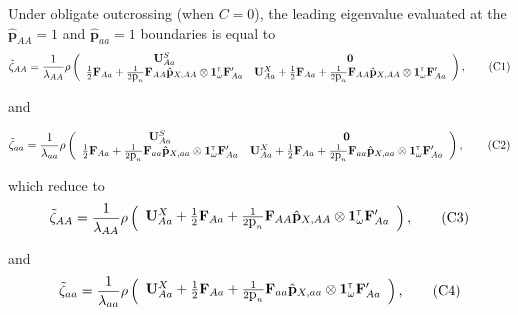 \documentclass[11pt]{article}
\newcommand\numberthis{\addtocounter{equation}{1}\tag{\theequation}}
\def\mbf#1{\mathbf{#1}}
\newcommand{\tr}{{\mbox{\tiny \sf T}}}
\begin{document}
Under obligate outcrossing (when $C=0$), the leading eigenvalue evaluated at the $\hat{\mbf{p}}_{AA} = 1$ and $\hat{\mbf{p}}_{aa} = 1$ boundaries is equal to
\begin{align*} \label{eq:eigAAOut}
	\tilde{\zeta}_{AA} = 
		\frac{1}{\lambda_{AA}}\rho\left(\begin{array}{cc}
\mathbf{U}^S_{Aa}  & \mathbf{0} \\
 \frac{1}{2} \mbf{F}_{Aa}+\frac{1}{2\mbox{p}_{n}}\mbf{F}_{AA} \hat{\mbf{p}}_{X,AA} \otimes \mathbf{1}^\tr_{\omega} \mathbf{F}_{Aa}^\prime &\mathbf{U}^X_{Aa} + \frac{1}{2} \mbf{F}_{Aa} +\frac{1}{2\mbox{p}_{n}} \mbf{F}_{AA} \hat{\mbf{p}}_{X,AA} \otimes \mathbf{1}^\tr_{\omega} \mathbf{F}_{Aa}^\prime
			\end{array} \right), \numberthis
\end{align*}

\noindent and

\begin{align*} \label{eq:eigaaOut}
	\tilde{\zeta}_{aa} = 
		\frac{1}{\lambda_{aa}}\rho\left(\begin{array}{cc}
\mathbf{U}^S_{Aa}  & \mathbf{0} \\
 \frac{1}{2} \mbf{F}_{Aa}+\frac{1}{2\mbox{p}_{n}}\mbf{F}_{aa} \hat{\mbf{p}}_{X,aa} \otimes \mathbf{1}^\tr_{\omega} \mathbf{F}_{Aa}^\prime &\mathbf{U}^X_{Aa} + \frac{1}{2} \mbf{F}_{Aa} +\frac{1}{2\mbox{p}_{n}} \mbf{F}_{aa} \hat{\mbf{p}}_{X,aa} \otimes \mathbf{1}^\tr_{\omega} \mathbf{F}_{Aa}^\prime
			\end{array} \right), \numberthis
\end{align*}

\noindent which reduce to 
\begin{align*} \label{eq:eigAATwoSex}
	\tilde{\zeta}_{AA} = 
		\frac{1}{\lambda_{AA}}\rho\left(\begin{array}{c}
\mathbf{U}^X_{Aa} + \frac{1}{2} \mbf{F}_{Aa} +\frac{1}{2\mbox{p}_{n}} \mbf{F}_{AA} \hat{\mbf{p}}_{X,AA} \otimes \mathbf{1}^\tr_{\omega} \mathbf{F}_{Aa}^\prime
			\end{array} \right), \numberthis
\end{align*}

\noindent and 
\begin{align*} \label{eq:eigaaTwoSex}
	\tilde{\zeta}_{aa} = 
		\frac{1}{\lambda_{aa}}\rho\left(\begin{array}{c}
\mathbf{U}^X_{Aa} + \frac{1}{2} \mbf{F}_{Aa} +\frac{1}{2\mbox{p}_{n}} \mbf{F}_{aa} \hat{\mbf{p}}_{X,aa} \otimes \mathbf{1}^\tr_{\omega} \mathbf{F}_{Aa}^\prime
			\end{array} \right), \numberthis
\end{align*}
\end{document}
